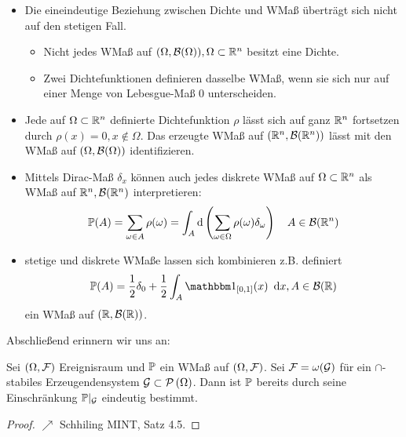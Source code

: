 \begin{*bemerkung}
    \begin{itemize}[leftmargin=*, nolistsep]
        \item Die eineindeutige Beziehung zwischen Dichte und WMaß überträgt sich nicht auf den stetigen Fall.
        \begin{itemize}[nolistsep]
            \item Nicht jedes WMaß auf $(\Omega, \borel{\Omega}), \Omega \subset \Rn$ besitzt eine Dichte.
            \item Zwei Dichtefunktionen definieren dasselbe WMaß, wenn sie sich nur auf einer Menge von Lebesgue-Maß $0$ unterscheiden.
        \end{itemize}
        \item Jede auf $\Omega \subset \Rn$ definierte Dichtefunktion $\rho$ lässt sich auf ganz $\Rn$ fortsetzen durch $\rho(x) = 0, x \notin \Omega$. Das erzeugte WMaß auf $(\Rn, \borel{\Rn})$ lässt mit den WMaß auf $(\Omega, \borel{\Omega})$ identifizieren.
        \item Mittels Dirac-Maß $\delta_{x}$ können auch jedes diskrete WMaß auf $\Omega \subset \Rn$ als WMaß auf $\Rn, \borel{\Rn}$ interpretieren:
        \begin{equation*}
            \P(A) = \sum_{\omega \in A} \rho(\omega) = \int_{A} \mathrm{d} \left( \sum_{\omega \in \Omega} \rho(\omega)\delta_{\omega} \right) \quad A \in \borel{\Rn}
        \end{equation*}
        \item stetige und diskrete WMaße lassen sich kombinieren z.B. definiert
        \begin{equation*}
            \P(A) = \frac{1}{2} \delta_{0} + \frac{1}{2} \int_{A} \one_{[0,1]}(x) \dx, A \in \borel{\R}
        \end{equation*}
        ein WMaß auf $(\R, \borel{\R})$.
    \end{itemize}
\end{*bemerkung}

Abschließend erinnern wir uns an:

\begin{satz} \label{satz: 1.9_eindeutigkeitssatz}
    Sei $(\Omega, \ereignisF)$ Ereignisraum und $\P$ ein WMaß auf $(\Omega, \ereignisF)$. 
    Sei $\ereignisF = \omega(\mathcal{G})$ für ein $\cap$-stabiles Erzeugendensystem $\mathcal{G} \subset \pows{\Omega}$. 
    Dann ist $\P$ bereits durch seine Einschränkung $\P |_{\mathcal{G}}$ eindeutig bestimmt.
\end{satz}
\begin{proof}
    $\nearrow$ Schhiling MINT, Satz 4.5.
\end{proof}

